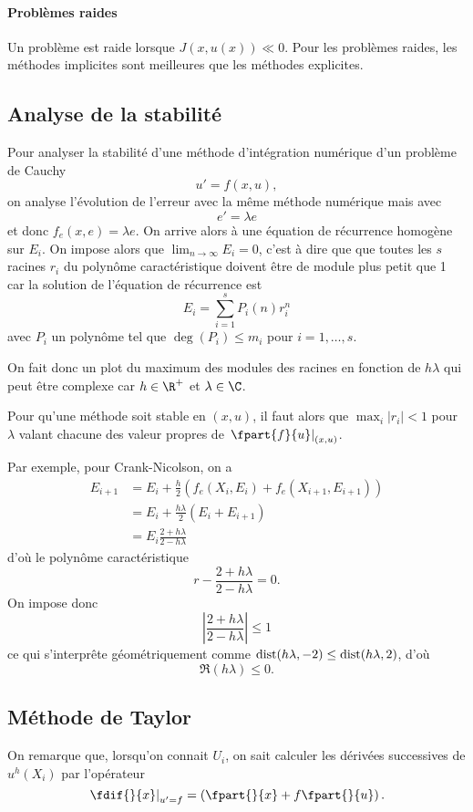 \paragraph{Problèmes raides}
Un problème est raide lorsque $J(x, u(x)) \ll 0$.
Pour les problèmes raides, les méthodes implicites sont meilleures que les
méthodes explicites.

\subsection{Analyse de la stabilité}
Pour analyser la stabilité d'une méthode d'intégration numérique d'un
problème de Cauchy
\[ u' = f(x, u), \]
on analyse l'évolution de l'erreur avec la même méthode
numérique mais avec
\[ e' = \lambda e \]
et donc $f_e(x, e) = \lambda e$.
On arrive alors à une équation de récurrence homogène sur $E_i$.
On impose alors que $\lim_{n \to \infty} E_i = 0$, c'est à dire que
que toutes les $s$ racines $r_i$ du polynôme caractéristique doivent être de module plus petit que 1
car la solution de l'équation de récurrence est
\[ E_i = \sum_{i = 1}^s P_i(n)r_i^n \]
avec $P_i$ un polynôme tel que
$\deg(P_i) \leq m_i$ pour $i = 1, \ldots, s$.

On fait donc un plot du maximum des modules des racines en fonction de $h\lambda$ qui peut
être complexe car $h \in \R^+$ et $\lambda \in \C$.

Pour qu'une méthode soit stable en $(x, u)$,
il faut alors que $\max_i |r_i| < 1$ pour
$\lambda$ valant chacune des valeur
propres de $\left.\fpart{f}{u}\right|_{(x,u)}$.

\begin{myexem}
  Par exemple, pour Crank-Nicolson, on a
  \begin{align*}
    E_{i+1} & = E_i + \frac{h}{2} (f_e(X_i, E_i) + f_e(X_{i+1}, E_{i+1}))\\
            & = E_i + \frac{h\lambda}{2} (E_i + E_{i+1})\\
            & = E_i \frac{2 + h\lambda}{2 - h\lambda}
  \end{align*}
  d'où le polynôme caractéristique
  \[ r - \frac{2 + h\lambda}{2 - h\lambda} = 0. \]
  On impose donc
  \[ \left|\frac{2 + h\lambda}{2 - h\lambda}\right| \leq 1 \]
  ce qui s'interprête géométriquement comme
  $\operatorname{dist}(h\lambda, -2) \leq \operatorname{dist}(h\lambda, 2)$, d'où
  \[ \Re(h\lambda) \leq 0. \]
\end{myexem}

\subsection{Méthode de Taylor}
On remarque que, lorsqu'on connait $U_i$, on sait calculer les dérivées
successives de $u^h(X_i)$ par l'opérateur
\[ \left.\fdif{}{x}\right|_{u'=f} = \left(\fpart{}{x} + f\fpart{}{u}\right). \]

